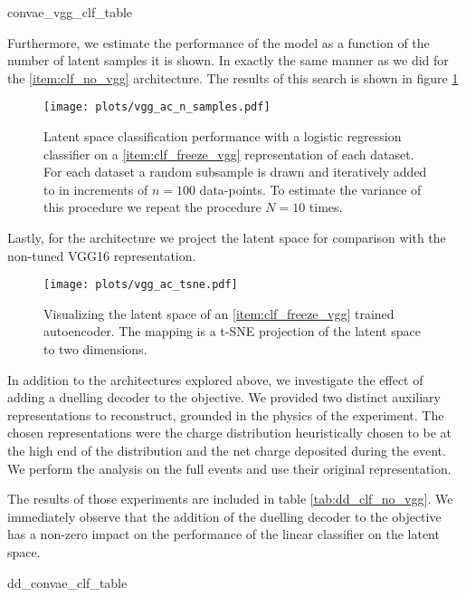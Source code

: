 \begin{table}
\centering
\caption{Logistic regression classification $f1$ scores using the \ref{item:clf_freeze_vgg} architecture. The standard error is reported from a $K=5$ fold cross validation of the logistic regression classifier.}\label{tab:clf_freeze_vgg}
{convae_vgg_clf_table}
\end{table}

\noindent Furthermore, we estimate the performance of the model as a function of the number of latent samples it is shown. In exactly the same manner as we did for the \ref{item:clf_no_vgg} architecture. The results of this search is shown in figure \ref{fig:vgg_ac_n_labelled}

\begin{figure}
\centering
\texttt{[image: plots/vgg\_ac\_n\_samples.pdf]}
\caption[Autoencoder performance on labelled subsets]{Latent space classification performance with a logistic regression classifier on a \ref{item:clf_freeze_vgg} representation of each dataset. For each dataset a random subsample is drawn and iteratively added to in increments of $n=100$ data-points. To estimate the variance of this procedure we repeat the procedure $N=10$ times.}\label{fig:vgg_ac_n_labelled}
\end{figure}

Lastly, for the architecture we project the latent space for comparison with the non-tuned VGG16 representation. 

\begin{figure}
\centering
\texttt{[image: plots/vgg\_ac\_tsne.pdf]}
\caption[VGG16-autoencoder latent space visualization]{Visualizing the latent space of an \ref{item:clf_freeze_vgg} trained autoencoder. The mapping is a t-SNE projection of the latent space to two dimensions.}\label{fig:vgg_ac_tnse}
\end{figure}

\noindent In addition to the architectures explored above, we investigate the effect of adding a duelling decoder to the objective. We provided two distinct auxiliary representations to reconstruct, grounded in the physics of the experiment. The chosen representations were the charge distribution heuristically chosen to be at the high end of the distribution and the net charge deposited during the event. We perform the analysis on the full events and use their original representation. 

The results of those experiments are included in table \ref{tab:dd_clf_no_vgg}. We immediately observe that the addition of the duelling decoder to the objective has a non-zero impact on the performance of the linear classifier on the latent space.

\begin{table}
\centering
{dd_convae_clf_table}
\caption{Logistic regression classification $f1$ scores using the \ref{item:clf_no_vgg} architecture, with a duelling decoder addition to the objective. This analysis was performed on full events, and not using a VGG representation. The standard error is reported from a $K=5$ fold cross validation of the logistic regression classifier.}\label{tab:dd_clf_no_vgg}
\end{table}